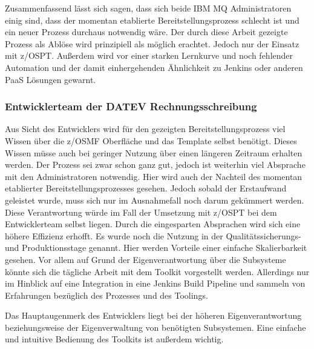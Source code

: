 Zusammenfassend lässt sich sagen, dass sich beide IBM MQ Administratoren einig sind, dass der momentan etablierte Bereitstellungsprozess schlecht ist und ein neuer Prozess durchaus notwendig wäre.
Der durch diese Arbeit gezeigte Prozess als Ablöse wird prinzipiell als möglich erachtet.
Jedoch nur der Einsatz mit z/OSPT.
Außerdem wird vor einer starken Lernkurve und noch fehlender Automation und der damit einhergehenden Ähnlichkeit zu Jenkins oder anderen PaaS Lösungen gewarnt.

\subsubsection{Entwicklerteam der DATEV Rechnungsschreibung}
Aus Sicht des Entwicklers wird für den gezeigten Bereitstellungsprozess viel Wissen über die z/OSMF Oberfläche und das Template selbst benötigt.
Dieses Wissen müsse auch bei geringer Nutzung über einen längeren Zeitraum erhalten werden.
Der Prozess sei zwar schon ganz gut, jedoch ist weiterhin viel Absprache mit den Administratoren notwendig.
Hier wird auch der Nachteil des momentan etablierter Bereitstellungsprozesses gesehen.
Jedoch sobald der Erstaufwand geleistet wurde, muss sich nur im Ausnahmefall noch darum gekümmert werden.
Diese Verantwortung würde im Fall der Umsetzung mit z/OSPT bei dem Entwicklerteam selbst liegen.
Durch die eingesparten Absprachen wird sich eine höhere Effizienz erhofft.
Es wurde noch die Nutzung in der Qualitätssicherungs- und Produktionsstage genannt.
Hier werden Vorteile einer einfache Skalierbarkeit gesehen.
Vor allem auf Grund der Eigenverantwortung über die Subsysteme könnte sich die tägliche Arbeit mit dem Toolkit vorgestellt werden.
Allerdings nur im Hinblick auf eine Integration in eine Jenkins Build Pipeline und sammeln von Erfahrungen bezüglich des Prozesses und des Toolings.

Das Hauptaugenmerk des Entwicklers liegt bei der höheren Eigenverantwortung beziehungsweise der Eigenverwaltung von benötigten Subsystemen.
Eine einfache und intuitive Bedienung des Toolkits ist außerdem wichtig.

